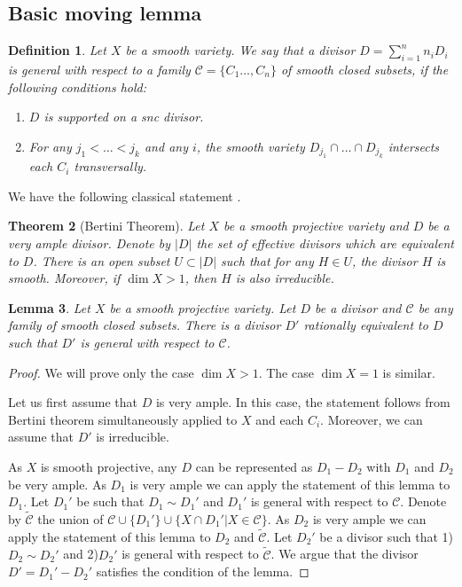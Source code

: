 \documentclass[12pt]{extarticle}
\newtheorem{theorem}{Theorem}[section]
\newtheorem{lemma}[theorem]{Lemma}
\newtheorem{definition}[theorem]{Definition}
\def\mc{\mathcal}
\def\wt{\widetilde}
\begin{document}
\subsection{Basic moving lemma}
\label{sec:moving_lemma}

\begin{definition}
    Let $X$ be a smooth variety. We say that a divisor $D=\sum\limits_{i=1}^n n_i D_i$ is general with respect to a family $\mc C=\{C_1\dots, C_n\}$ of smooth closed subsets, if the following conditions hold:
    \begin{enumerate}
        \item $D$ is supported on a snc divisor.
        \item For any $j_1<\dots< j_k$ and any $i$, the smooth variety $D_{j_1}\cap\dots\cap D_{j_k}$ intersects each $C_i$ transversally.
    \end{enumerate}
\end{definition}

We have the following classical statement \cite[Theorem 8.18]{hartshorne2013algebraic}.

\begin{theorem}[Bertini Theorem]
    Let $X$ be a smooth projective variety and $D$ be a very ample divisor. Denote by $|D|$ the set of effective divisors which are equivalent to $D$. There is an open subset $U\subset |D|$ such that for any $H\in U$, the divisor $H$ is smooth. Moreover, if $\dim X>1$, then $H$ is also irreducible.
\end{theorem}

\begin{lemma}
\label{lemma:moving_lemma_Bertini}
    Let $X$ be a smooth projective variety. Let $D$ be a divisor and $\mc C$ be any family of smooth closed subsets. There is a divisor $D'$ rationally equivalent to $D$ such that $D'$ is general with respect to $\mc C$.
\end{lemma}


 \begin{proof} We will prove only the case $\dim X>1$. The case $\dim X=1$ is similar.
 
 Let us first assume that $D$ is very ample. In this case, the statement follows from Bertini theorem simultaneously applied to $X$ and each $C_i$. Moreover, we can assume that $D'$ is irreducible.
 
As $X$ is smooth projective, any $D$ can be represented as $D_1-D_2$ with $D_1$ and $D_2$ be very ample. As $D_1$ is very ample we can apply the statement of this lemma to $D_1$. Let $D_1'$ be such that $D_1\sim D_1'$ and $D_1'$ is general with respect to $\mc C$. Denote by $\wt{\mc C}$ the union of $\mc C\cup \{D_1'\}\cup \{X\cap D_1'|X\in \mc C\}$. As $D_2$ is very ample we can apply the statement of this lemma to $D_2$  and $\wt{\mc C}$. Let $D_2'$ be a divisor such that 1)$D_2\sim D_2'$ and 2)$D_2'$ is general with respect to $\wt{\mc C}$. We argue that the divisor $D'=D_1'-D_2'$ satisfies the condition of the lemma.
 \end{proof}
\end{document}
